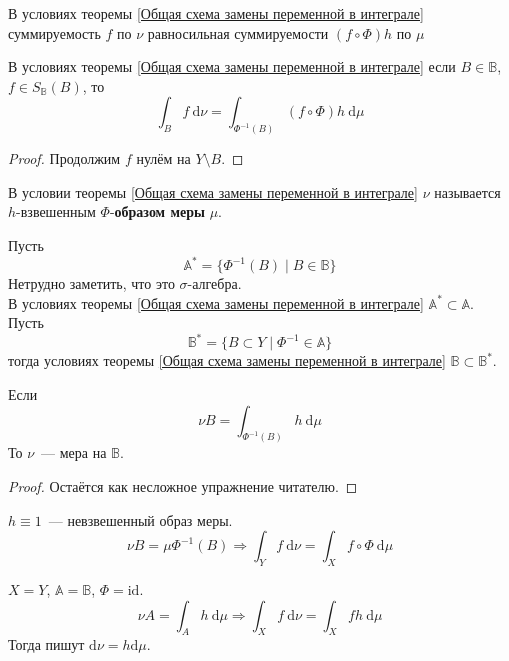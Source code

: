 \documentclass{article}
\begin{document}
    \begin{remark}
        В условиях теоремы \ref{Общая схема замены переменной в интеграле} суммируемость $f$ по $\nu$ равносильная суммируемости $(f\circ\Phi)h$ по $\mu$
    \end{remark}
    \begin{corollary}
        В условиях теоремы \ref{Общая схема замены переменной в интеграле} если $B\in\mathbb B$, $f\in S_{\mathbb B}(B)$, то
        $$
        \int_B f~\mathrm d\nu=\int_{\Phi^{-1}(B)}(f\circ\Phi)h~\mathrm d\mu
        $$
    \end{corollary}
    \begin{proof}
        Продолжим $f$ нулём на $Y\setminus B$.
    \end{proof}
    \begin{definition}
        В условии теоремы \ref{Общая схема замены переменной в интеграле} $\nu$ называется $h$-взвешенным $\Phi$-\textbf{образом меры} $\mu$.
    \end{definition}
    \begin{remark}
        Пусть
        $$
        \mathbb A^*=\{\Phi^{-1}(B)\mid B\in\mathbb B\}
        $$
        Нетрудно заметить, что это $\sigma$-алгебра.\\
        В условиях теоремы \ref{Общая схема замены переменной в интеграле} $\mathbb A^*\subset\mathbb A$.\\
        Пусть
        $$
        \mathbb B^*=\{B\subset Y\mid \Phi^{-1}\in\mathbb A\}
        $$
        тогда условиях теоремы \ref{Общая схема замены переменной в интеграле} $\mathbb B\subset\mathbb B^*$.
    \end{remark}
    \begin{claim}
        Если
        $$
        \nu B=\int_{\Phi^{-1}(B)}h~\mathrm d\mu
        $$
        То $\nu$~--- мера на $\mathbb B$.
    \end{claim}
    \begin{proof}
        Остаётся как несложное упражнение читателю.
    \end{proof}
    \begin{example}
        $h\equiv1$~--- невзвешенный образ меры.
        $$
        \nu B=\mu\Phi^{-1}(B)\Rightarrow \int_Yf~\mathrm d\nu=\int_Xf\circ\Phi~\mathrm d\mu
        $$
    \end{example}
    \begin{example}
        $X=Y$, $\mathbb A=\mathbb B$, $\Phi=\mathrm{id}$.
        $$
        \nu A=\int_A h~\mathrm d\mu\Rightarrow \int_X f~\mathrm d\nu=\int_Xfh~\mathrm d\mu
        $$
        Тогда пишут $\mathrm d\nu=h\mathrm d\mu$.
    \end{example}
\end{document}
